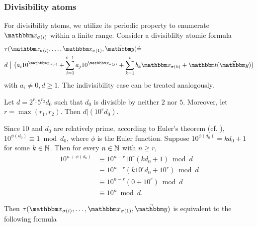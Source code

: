 \subsubsection{Divisibility atoms}

For divisibility atoms, we utilize its periodic property to enumerate $\ivarx_{\sigma(i)}$ within a finite range.
Consider a divisiblilty atomic formula 
\begin{equation}
    \begin{aligned}
        &\tau(\ivarx_{\sigma(i)}, \ldots, \ivarx_{\sigma(1)}, \vec{\ivary}) \Def  \\
        &d\ \big \vert \ \big(a_i 10^{\ivarx_{\sigma(i)}} + \sum_{j=1}^{i-1} a_j 10^{\ivarx_{\sigma(j)}} + \sum_{k=1}^{i} b_k \ivarx_{\sigma(k)} 
        + \iterm(\vec{\ivary}) \big)               
    \end{aligned}
\end{equation}
with $a_i \neq 0, d\ge 1$. The indivisibility case can be treated analogously.

Let $d = 2^{r_1} 5^{r_2}  d_0$ such that $d_0$ is divisible by neither $2$ nor $5$. Moreover, let $r = \max(r_1, r_2)$. Then $d \vert  (10^rd_0)$. 

Since $10$ and $d_0$ are relatively prime, according to Euler's theorem (cf. \cite{HW80}), $10^{\phi(d_0)} \equiv 1 \bmod d_0$, where $\phi$ is the Euler function. Suppose $10^{\phi(d_0)} = kd_0 + 1$ for some $k \in \mathbb{N}$. 
Then for every $n \in \mathbb{N}$ with $n \ge r$, 
$$\begin{aligned}
    10^{n + \phi(d_0)} 
    &\equiv 10^{n-r} 10^r (kd_0 + 1) \bmod d\\
    &\equiv 10^{n-r} (k 10^rd_0 + 10^r) \bmod d\\
    &\equiv 10^{n-r} (0+10^r) \bmod d\\
    &\equiv 10^n \bmod d.
\end{aligned}$$


Then $\tau(\ivarx_{\sigma(i)}, \ldots, \ivarx_{\sigma(1)}, \vec{\ivary})$ is equivalent to the following formula

